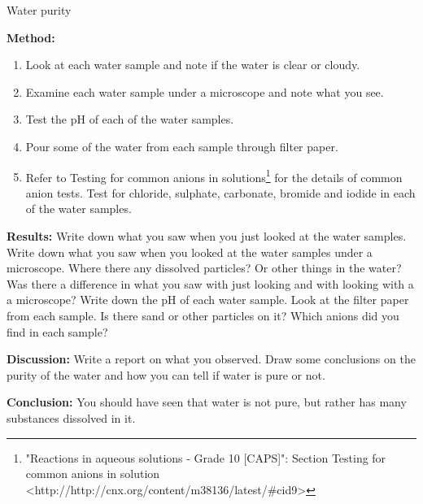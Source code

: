 \begin{g_experiment}{Water purity}
\par 
\label{m38138*id438234}\noindent{}\textbf{Method:}\newline
\label{m38138*id827732}\begin{enumerate}[noitemsep, label=\textbf{\arabic*}. ] 
            \item Look at each water sample and note if the water is clear or cloudy.\item Examine each water sample under a microscope and note what you see.\item Test the pH of each of the water samples.\item Pour some of the water from each sample through filter paper.\item 
Refer to Testing for common anions in solutions\footnote{\raggedright{}"Reactions in aqueous solutions - Grade 10 [CAPS]": Section Testing for common anions in solution <http://http://cnx.org/content/m38136/latest/\#cid9>} for the details of common anion tests. Test for chloride, sulphate, carbonate, bromide and iodide in each of the water samples.\end{enumerate}
\par  
\label{m38138*id63284}\noindent{}\textbf{Results:}\newline
Write down what you saw when you just looked at the water samples. Write down what you saw when you looked at the water samples under a microscope. Where there any dissolved particles? Or other things in the water? Was there a difference in what you saw with just looking and with looking with a a microscope? Write down the pH of each water sample. Look at the filter paper from each sample. Is there sand or other particles on it? Which anions did you find in each sample? 
\par 
\label{m38138*id3429827}\noindent{}\textbf{Discussion:}\newline
Write a report on what you observed. Draw some conclusions on the purity of the water and how you can tell if water is pure or not.
\par  
\label{m38138*id68921}\noindent{}\textbf{Conclusion:}\newline
    You should have seen that water is not pure, but rather has many substances dissolved in it.
\par 
\end{g_experiment}
\label{m38138*id672214}
